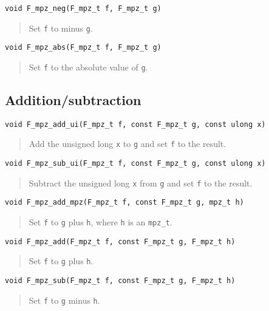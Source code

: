 \documentclass[a4paper,10pt]{article}
\newcommand{\code}{\lstinline}
\begin{document}
\begin{lstlisting}
void F_mpz_neg(F_mpz_t f, F_mpz_t g)
\end{lstlisting}
\begin{quote}
Set \code{f} to minus \code{g}. 
\end{quote}

\begin{lstlisting}
void F_mpz_abs(F_mpz_t f, F_mpz_t g)
\end{lstlisting}
\begin{quote}
Set \code{f} to the absolute value of \code{g}. 
\end{quote}

\subsection{Addition/subtraction}

\begin{lstlisting}
void F_mpz_add_ui(F_mpz_t f, const F_mpz_t g, const ulong x)
\end{lstlisting}
\begin{quote}
Add the unsigned long \code{x} to \code{g} and set \code{f} to the result.
\end{quote}

\begin{lstlisting}
void F_mpz_sub_ui(F_mpz_t f, const F_mpz_t g, const ulong x)
\end{lstlisting}
\begin{quote}
Subtract the unsigned long \code{x} from \code{g} and set \code{f} to the result.
\end{quote}

\begin{lstlisting}
void F_mpz_add_mpz(F_mpz_t f, const F_mpz_t g, mpz_t h)
\end{lstlisting}
\begin{quote}
Set \code{f} to \code{g} plus \code{h}, where \code{h} is an \code{mpz_t}. 
\end{quote}

\begin{lstlisting}
void F_mpz_add(F_mpz_t f, const F_mpz_t g, F_mpz_t h)
\end{lstlisting}
\begin{quote}
Set \code{f} to \code{g} plus \code{h}. 
\end{quote}

\begin{lstlisting}
void F_mpz_sub(F_mpz_t f, const F_mpz_t g, F_mpz_t h)
\end{lstlisting}
\begin{quote}
Set \code{f} to \code{g} minus \code{h}. 
\end{quote}
\end{document}
